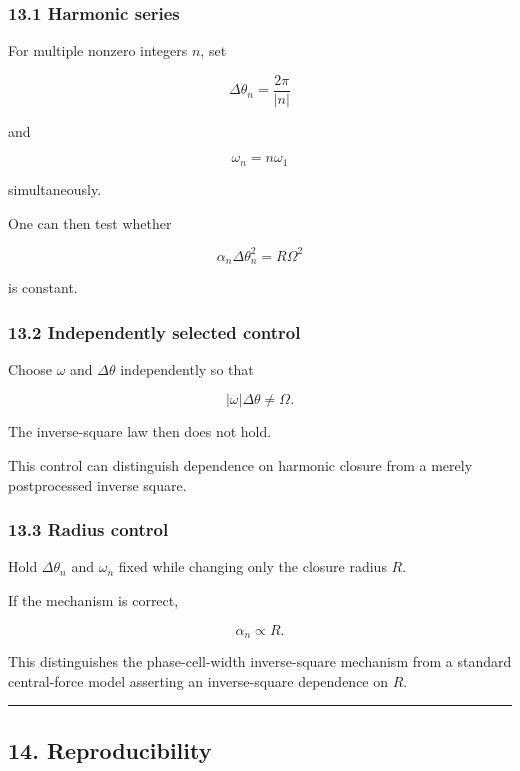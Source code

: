 \documentclass[
  10pt,
  a4paper,
]{article}
\begin{document}
\subsubsection{13.1 Harmonic series}\label{harmonic-series}

For multiple nonzero integers \(n\), set

\[
\Delta\theta_n=\frac{2\pi}{|n|}
\]

and

\[
\omega_n=n\omega_1
\]

simultaneously.

One can then test whether

\[
\alpha_n\Delta\theta_n^2
=R\Omega^2
\]

is constant.

\subsubsection{13.2 Independently selected
control}\label{independently-selected-control}

Choose \(\omega\) and \(\Delta\theta\) independently so that

\[
|\omega|\Delta\theta\neq\Omega.
\]

The inverse-square law then does not hold.

This control can distinguish dependence on harmonic closure from a
merely postprocessed inverse square.

\subsubsection{13.3 Radius control}\label{radius-control}

Hold \(\Delta\theta_n\) and \(\omega_n\) fixed while changing only the
closure radius \(R\).

If the mechanism is correct,

\[
\alpha_n\propto R.
\]

This distinguishes the phase-cell-width inverse-square mechanism from a
standard central-force model asserting an inverse-square dependence on
\(R\).

\begin{center}\rule{0.5\linewidth}{0.5pt}\end{center}

\subsection{14. Reproducibility}\label{reproducibility}
\end{document}
